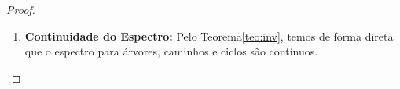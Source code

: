 \begin{theorem}
\begin{proof}
\begin{enumerate}[leftmargin=*]
        Para ciclos $C_n$, o tamanho máximo de um conjunto independente é $\lfloor \frac{n}{2} \rfloor$, impondo um valor mínimo para o número de vértices que estão em um conjunto de envoltória de $n - \lfloor \frac{n}{2} \rfloor = \lceil \frac{n}{2} \rceil$, limite este alcançado quando a orientação é um ciclo direcionado.
    
        Para caminhos $P_n$, os vértices das extremidades são folhas, logo são vértices extremos e devem pertencer a um conjunto de envoltória $S$. Os $n-2$ vértices internos formam um subcaminho cujo maior conjunto independente tem tamanho $\floor{\frac{n-2}{2}}$. Assim, o tamanho mínimo de $S$ é $2 + (n-2) - \floor{\frac{n-2}{2}} = \ceil{\frac{n+1}{2}}$, limite alcançado orientando o caminho para uma só direção.

        \item \textbf{Continuidade do Espectro:} Pelo Teorema\ref{teo:inv}, temos de forma direta que o espectro para árvores, caminhos e ciclos são contínuos.
    \end{enumerate}  

\end{proof}
    
\end{theorem}